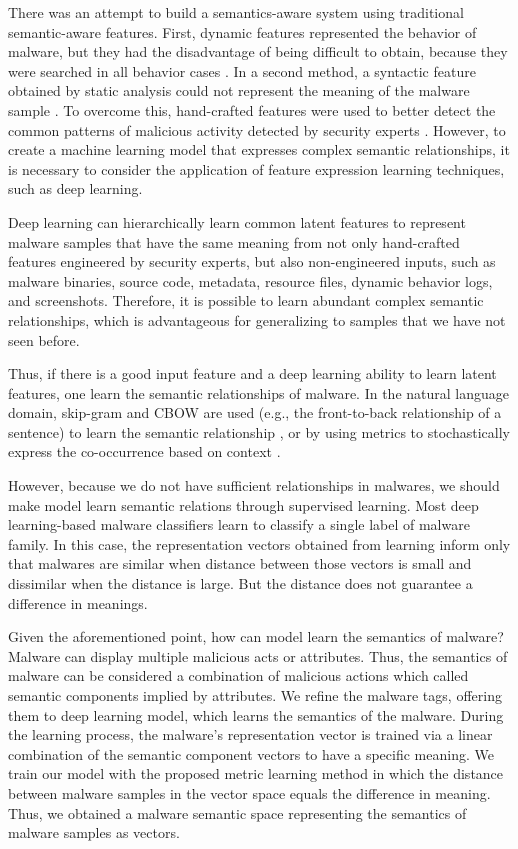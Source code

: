 There was an attempt to build a semantics-aware system using traditional semantic-aware features. First, dynamic features represented the behavior of malware, but they had the disadvantage of being difficult to obtain, because they were searched in all behavior cases \cite{jiang2007stealthy, yan2012droidscope, reina2013system}. In a second method, a syntactic feature obtained by static analysis could not represent the meaning of the malware sample \cite{christodorescu2005semantics, zhang2014semantics}. To overcome this, hand-crafted features were used to better detect the common patterns of malicious activity detected by security experts \cite{jang2011bitshred}. However, to create a machine learning model that expresses complex semantic relationships, it is necessary to consider the application of feature expression learning techniques, such as deep learning.
 
Deep learning can hierarchically learn common latent features to represent malware samples that have the same meaning from not only hand-crafted features engineered by security experts, but also non-engineered inputs, such as malware binaries, source code, metadata, resource files, dynamic behavior logs, and screenshots. Therefore, it is possible to learn abundant complex semantic relationships, which is advantageous for generalizing to samples that we have not seen before.


Thus, if there is a good input feature and a deep learning ability to learn latent features, one learn the semantic relationships of malware. In the natural language domain, skip-gram and CBOW are used (e.g., the front-to-back relationship of a sentence) to learn the semantic relationship \cite{mikolov2013efficient}, or by using metrics to stochastically express the co-occurrence based on context \cite{pennington2014glove}.


However, because we do not have sufficient relationships in malwares, we should make model learn semantic relations through supervised learning. Most deep learning-based malware classifiers learn to classify a single label of malware family. In this case, the representation vectors obtained from learning inform only that malwares are similar when distance between those vectors is small and dissimilar when the distance is large. But the distance does not guarantee a difference in meanings.

Given the aforementioned point, how can model learn the semantics of malware? Malware can display multiple malicious acts or attributes. Thus, the semantics of malware can be considered a combination of malicious actions which called semantic components implied by attributes. We refine the malware tags, offering them to deep learning model, which learns the semantics of the malware. During the learning process, the malware's representation vector is trained via a linear combination of the semantic component vectors to have a specific meaning. We train our model with the proposed metric learning method in which the distance between malware samples in the vector space equals the difference in meaning. Thus, we obtained a malware semantic space representing the semantics of malware samples as vectors.

